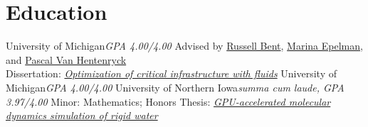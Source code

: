 \section{Education}
		{University of Michigan}{}{\textit{GPA 4.00/4.00}}
		{Advised by \href{https://public.lanl.gov/rbent}{Russell Bent}, \href{http://www-personal.umich.edu/~mepelman}{Marina Epelman}, and \href{https://sites.gatech.edu/pascal-van-hentenryck}{Pascal Van Hentenryck} \\ Dissertation: \href{https://deepblue.lib.umich.edu/handle/2027.42/169849}{\textit{Optimization of critical infrastructure with fluids}}}
		{University of Michigan}{}{\textit{GPA 4.00/4.00}}{}
		{University of Northern Iowa}{}{\textit{summa cum laude, GPA 3.97/4.00}}
		{Minor: Mathematics; Honors Thesis: \href{http://byron.tasseff.com/documents/reports/2012-gpu_accelerated_molecular_dynamics_simulation_of_rigid_water.pdf}{\textit{GPU-accelerated molecular dynamics simulation of rigid water}}}
